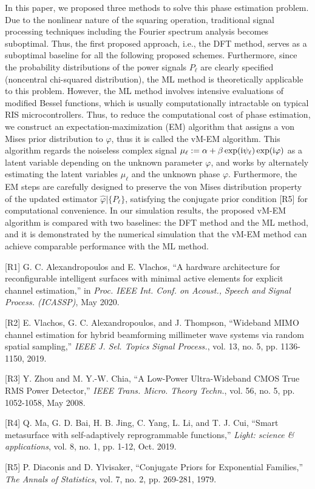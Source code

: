 \documentclass[a4paper,12pt]{article}
\def \ri {{\rm i}}
\begin{document}
{{In this paper, we proposed three methods to solve this phase estimation problem. Due to the nonlinear nature of the squaring operation, traditional signal processing techniques including the Fourier spectrum analysis becomes suboptimal. Thus, the first proposed approach, i.e., the DFT method, serves as a suboptimal baseline for all the following proposed schemes. Furthermore, since the probability distributions of the power signals $P_\ell$ are clearly specified (noncentral chi-squared distribution), the ML method is theoretically applicable to this problem. However, the ML method involves intensive evaluations of modified Bessel functions, which is usually computationally intractable on typical RIS microcontrollers. 
Thus, to reduce the computational cost of phase estimation, we construct an expectation-maximization (EM) algorithm that assigns a von Mises prior distribution to $\varphi$, thus it is called the vM-EM algorithm. 
This algorithm regards the noiseless complex signal $\mu_\ell := \alpha+\beta\exp(\ri\psi_\ell)\exp(\ri\varphi)$ as a latent variable depending on the unknown parameter $\varphi$, and works by alternately estimating the latent variables $\mu_\ell$ and the unknown phase $\varphi$. 
Furthermore, the EM steps are carefully designed to preserve the von Mises distribution property of the updated estimator $\hat{\varphi}|\{P_\ell\}$, satisfying the conjugate prior condition [R5] for computational convenience. In our simulation results, the proposed vM-EM algorithm is compared with two baselines: the DFT method and the ML method, and it is demonstrated by the numerical simulation that the vM-EM method can achieve comparable performance with the ML method. 

[R1] G. C. Alexandropoulos and E. Vlachos, ``A hardware architecture for reconfigurable intelligent surfaces with minimal active elements for explicit channel estimation,'' in {\it Proc. IEEE Int. Conf. on Acoust., Speech
and Signal Process. (ICASSP)}, May 2020. 

[R2] E. Vlachos, G. C. Alexandropoulos, and J. Thompson, ``Wideband MIMO channel estimation for hybrid beamforming millimeter wave systems via random spatial sampling,'' {\it IEEE J. Sel. Topics Signal Process.}, vol. 13, no. 5, pp. 1136-1150, 2019.

[R3] Y. Zhou and M. Y.-W. Chia, ``A Low-Power Ultra-Wideband CMOS True RMS Power Detector,'' {\it IEEE Trans. Micro. Theory Techn.}, vol. 56, no. 5, pp. 1052-1058, May 2008. 

[R4] Q. Ma, G. D. Bai, H. B. Jing, C. Yang, L. Li, and T. J. Cui, ``Smart metasurface with self-adaptively reprogrammable functions,'' {\it Light: science \& applications}, vol. 8, no. 1, pp. 1-12, Oct. 2019.

[R5] P. Diaconis and D. Ylvisaker, ``Conjugate Priors for Exponential Families,'' {\it The Annals of Statistics}, vol. 7, no. 2, pp. 269-281, 1979.


}}
\end{document}
